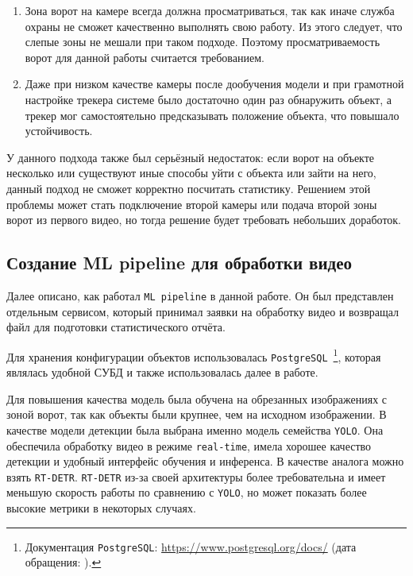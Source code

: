 \begin{enumerate}
      \item Зона ворот на камере всегда должна просматриваться,
      так как иначе служба охраны не сможет качественно выполнять свою работу.
      Из этого следует, что слепые зоны не мешали при таком подходе.
      Поэтому просматриваемость ворот для данной работы считается требованием.
      \item Даже при низком качестве камеры после дообучения модели
      и при грамотной настройке трекера системе было достаточно один раз обнаружить объект,
      а трекер мог самостоятельно предсказывать положение объекта, что повышало устойчивость.
\end{enumerate}

У данного подхода также был серьёзный недостаток: если ворот на объекте несколько
или существуют иные способы уйти с объекта или зайти на него, данный подход не сможет корректно посчитать статистику.
Решением этой проблемы может стать подключение второй камеры или подача второй зоны ворот из первого видео,
но тогда решение будет требовать небольших доработок.

\subsection{Создание ML pipeline для обработки видео}
\label{subsec:creating_ml_pipeline}

Далее описано, как работал \texttt{ML pipeline} в данной работе.
Он был представлен отдельным сервисом, который принимал заявки на обработку видео
и возвращал файл для подготовки статистического отчёта.



Для хранения конфигурации объектов использовалась \texttt{PostgreSQL}~\footnote{Документация \texttt{PostgreSQL}: \url{https://www.postgresql.org/docs/} (дата обращения: ).}, которая являлась удобной СУБД и также использовалась далее в работе.

Для повышения качества модель была обучена на обрезанных изображениях с зоной ворот,
так как объекты были крупнее, чем на исходном изображении.
В качестве модели детекции была выбрана именно модель семейства \texttt{YOLO}.
Она обеспечила обработку видео в режиме \texttt{real-time}, имела хорошее качество детекции и удобный интерфейс обучения и инференса.
В качестве аналога можно взять \texttt{RT-DETR}. \texttt{RT-DETR} из-за своей архитектуры более требовательна
и имеет меньшую скорость работы по сравнению с \texttt{YOLO},
но может показать более высокие метрики в некоторых случаях.

